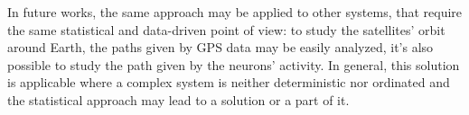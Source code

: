 \documentclass[class=article, crop=false]{standalone}
\begin{document}
In future works, the same approach may be applied to other systems, that require the same statistical and data-driven point of view: 
to study the satellites' orbit around Earth, the paths given by GPS data may be easily analyzed, it's also possible to study the path given by the neurons' activity.
In general, this solution is applicable where a complex system is neither deterministic nor ordinated and the statistical approach may lead to a solution or a part of it.
\end{document}
